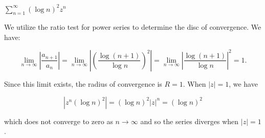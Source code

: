 $\sum\limits_{n=1}^{\infty}{(\log n)^2 z^n}$

\begin{solution}
    We utilize the ratio test for power series to determine the disc of convergence. We have:

    $$
    \lim\limits_{n \to \infty}{\left| \frac{a_{n+1}}{a_n} \right|} = \lim\limits_{n \to \infty}{\left| \left( \frac{\log {(n+1)}}{\log {n}} \right)^2 \right|} 
                                                                   = \lim\limits_{n \to \infty}{\left| \frac{\log {(n+1)}}{\log {n}} \right|^2} 
                                                                   = 1.
    $$

    Since this limit exists, the radius of convergence is $R = 1$. When $|z| = 1$, we have 
    
    $$
    \left| z^n (\log{n})^2 \right| = (\log{n})^2 |z|^n = (\log{n})^2
    $$

    which does not converge to zero as $n \to \infty$ and so the series diverges when $|z| = 1$.
    \ \\
\end{solution}